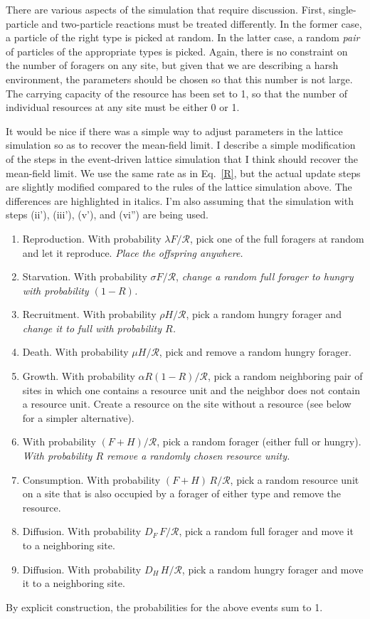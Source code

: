 \documentclass[11pt]{iopart}
\begin{document}
There are various aspects of the simulation that require discussion.  First,
single-particle and two-particle reactions must be treated differently.  In
the former case, a particle of the right type is picked at random.  In the
latter case, a random \emph{pair} of particles of the appropriate types is
picked.  Again, there is no constraint on the number of foragers on any site,
but given that we are describing a harsh environment, the parameters should
be chosen so that this number is not large.  The carrying capacity of the
resource has been set to 1, so that the number of individual resources at any
site must be either 0 or 1.

It would be nice if there was a simple way to adjust parameters in the
lattice simulation so as to recover the mean-field limit.  I describe a
simple modification of the steps in the event-driven lattice simulation that
I think should recover the mean-field limit.  We use the same rate as in
Eq.~\eqref{R}, but the actual update steps are slightly modified compared to
the rules of the lattice simulation above.  The differences are highlighted in
italics.  I'm also assuming that the simulation with steps (ii'), (iii'),
(v'), and (vi'') are being used.
\begin{enumerate}
\item Reproduction.  With probability $\lambda F/\mathcal{R}$, pick one of
  the full foragers at random and let it reproduce.  \emph{Place the
    offspring anywhere.}
\item Starvation.  With probability $\sigma F/\mathcal{R}$, \emph{change a
    random full forager to hungry with probability $(1-R)$.}
\item Recruitment.  With probability $\rho H/\mathcal{R}$, pick a random
  hungry forager and \emph{change it to full with probability $R$.}
\item Death.  With probability $\mu H/\mathcal{R}$, pick and remove a random
  hungry forager.
\item Growth.  With probability $\alpha R(1-R)/\mathcal{R}$, pick a random
  neighboring pair of sites in which one contains a resource unit and the
  neighbor does not contain a resource unit.  Create a resource on the site
  without a resource (see below for a simpler alternative).
\item With probability $(F+H)/\mathcal{R}$, pick a random forager
  (either full or hungry).  \emph{With probability $R$ remove a randomly
    chosen resource unity.}
\item Consumption.  With probability $(F+H)\,R/\mathcal{R}$, pick a random
  resource unit on a site that is also occupied by a forager of either type
  and remove the resource.
\item Diffusion.  With probability $D_F\, F/\mathcal{R}$, pick a random full
  forager and move it to a neighboring site.
\item Diffusion.  With probability $D_H\, H/\mathcal{R}$, pick a random
  hungry forager and move it to a neighboring site.
\end{enumerate}
By explicit construction, the probabilities for the above events sum to 1.
\end{document}
